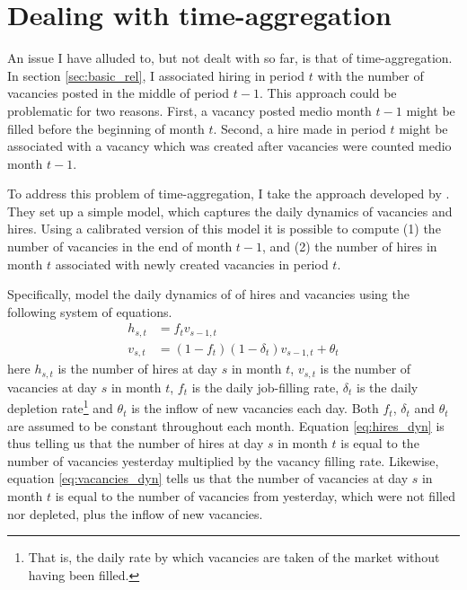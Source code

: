 \section{Dealing with time-aggregation}
\label{sec:time_agg}

An issue I have alluded to, but not dealt with so far, is that of time-aggregation. In section \ref{sec:basic_rel}, I associated 
 hiring in period $t$ with the number of vacancies posted in the middle of period $t-1$. This approach could be problematic for two reasons. First, a vacancy posted medio month $t-1$ might be filled before the beginning of month $t$. Second, a hire made in period $t$ might be associated with a vacancy which was created after vacancies were counted medio month $t-1$. 
 
To address this problem of time-aggregation, I take the approach developed by \cite{Davis2013}. They set up a simple model, which captures the daily dynamics of vacancies and hires. Using a calibrated version of this model it is possible to compute (1) the number of vacancies in the end of month $t-1$, and (2) the number of hires in month $t$ associated with newly created vacancies in period $t$. 

Specifically, \cite{Davis2013} model the daily dynamics of of hires and vacancies using the following system of equations.
\begin{align}
h_{s,t}&=f_t v_{s-1,t} \label{eq:hires_dyn} \\
v_{s,t}&=(1-f_t)(1-\delta_t)v_{s-1,t} + \theta_t \label{eq:vacancies_dyn} 
\end{align}
here $h_{s,t}$ is the number of hires at day $s$ in month $t$, $v_{s,t}$ is the number of vacancies at day $s$ in month $t$, $f_t$ is the daily job-filling rate, $\delta_t$ is the daily depletion rate\footnote{That is, the daily rate by which vacancies are taken of the market without having been filled.} and $\theta_t$ is the inflow of new vacancies each day. Both $f_t$, $\delta_t$ and $\theta_t$ are assumed to be constant throughout each month. Equation \eqref{eq:hires_dyn} is thus telling us that the number of hires at day $s$ in month $t$ is equal to the number of vacancies yesterday multiplied by the vacancy filling rate. Likewise, equation \eqref{eq:vacancies_dyn} tells us that the number of vacancies at day $s$ in  month $t$ is equal to the number of vacancies from yesterday, which were not filled nor depleted, plus the inflow of new vacancies. 


